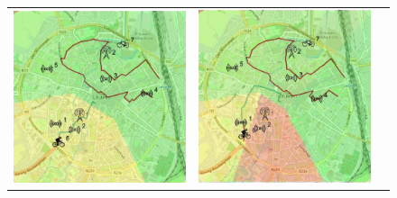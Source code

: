 \begin{figure}[h]
    \centering
    \begin{tabular}{lll}
         \includegraphics[scale=0.42]{figures/sim1snap1.png}  &
         \includegraphics[scale=0.42]{figures/sim1snap2.png} &

\end{tabular}
\end{figure}
